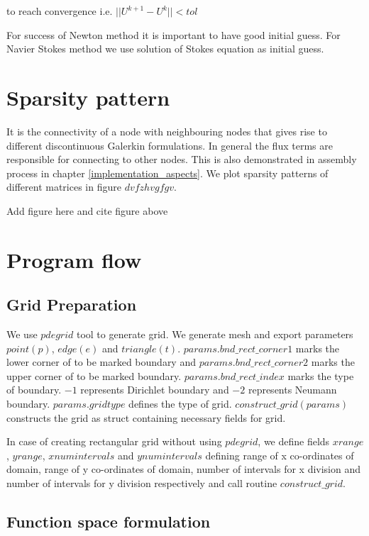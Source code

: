\documentclass[a4paper,12pt]{book}
\begin{document}
to reach convergence i.e. $||U^{k+1} - U^k|| < tol$

For success of Newton method it is important to have good initial guess. For Navier Stokes method we use solution of Stokes equation as initial guess.

\section{Sparsity pattern}

It is the connectivity of a node with neighbouring nodes that gives rise to different discontinuous Galerkin formulations. In general the flux terms are responsible for connecting to other nodes. This is also demonstrated in assembly process in chapter \ref{implementation_aspects}. We plot sparsity patterns of different matrices in figure $dvfzhvgfgv$.

\begin{huge}
Add figure here and cite figure above
\end{huge}

\section{Program flow}

\subsection{Grid Preparation}

We use $pdegrid$ tool to generate grid. We generate mesh and export parameters $point(p)$, $edge(e)$ and $triangle(t)$. $params.bnd\_rect\_corner1$ marks the lower corner of to be marked boundary and $params.bnd\_rect\_corner2$ marks the upper corner of to be marked boundary. $params.bnd\_rect\_index$ marks the type of boundary. $-1$ represents Dirichlet boundary and $-2$ represents Neumann boundary. $params.gridtype$ defines the type of grid. $construct\_grid(params)$ constructs the grid as struct containing necessary fields for grid. 

In case of creating rectangular grid without using $pdegrid$, we define fields $xrange$, $yrange$, $xnumintervals$ and $ynumintervals$ defining range of x co-ordinates of domain, range of y co-ordinates of domain, number of intervals for x division and number of intervals for y division respectively and call routine $construct\_grid$.

\subsection{Function space formulation}
\end{document}
